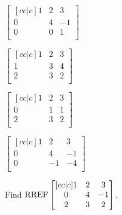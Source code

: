 \documentclass{article}
\begin{document}
\begin{readinessAssuranceTest}
  \begin{multicols}{4}
  \begin{readinessAssuranceTestChoices}
  \item
    \(
      \begin{bmatrix}[cc|c]
        1 & 2 & 3 \\
        0 & 4 & -1 \\
        0 & 0 & 1 \\
      \end{bmatrix}
    \)
  \item
    \(
      \begin{bmatrix}[cc|c]
        1 & 2 & 3 \\
        1 & 3 & 4 \\
        2 & 3 & 2 \\
      \end{bmatrix}
    \)
  \item
    \(
      \begin{bmatrix}[cc|c]
        1 & 2 & 3 \\
        0 & 1 & 1 \\
        2 & 3 & 2 \\
      \end{bmatrix}
    \)
  \item
    \(
      \begin{bmatrix}[cc|c]
        1 & 2 & 3 \\
        0 & 4 & -1 \\
        0 & -1 & -4 \\
      \end{bmatrix}
    \) %
  \end{readinessAssuranceTestChoices}
  \end{multicols}

\item Find
  \(\operatorname{RREF}
    \begin{bmatrix}[cc|c]
      1 & 2 & 3 \\
      0 & 4 & -1 \\
      2 & 3 & 2 \\
    \end{bmatrix}
  \).


\end{readinessAssuranceTest}
\end{document}
